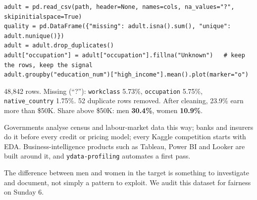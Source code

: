 \documentclass[11pt,a4paper]{article}
\begin{document}
\begin{bcode}
\begin{lstlisting}
adult = pd.read_csv(path, header=None, names=cols, na_values="?", skipinitialspace=True)
quality = pd.DataFrame({"missing": adult.isna().sum(), "unique": adult.nunique()})
adult = adult.drop_duplicates()
adult["occupation"] = adult["occupation"].fillna("Unknown")   # keep the rows, keep the signal
adult.groupby("education_num")["high_income"].mean().plot(marker="o")
\end{lstlisting}
\end{bcode}

\begin{bres}
48,842 rows. Missing (``?''): \texttt{workclass} 5.73\%, \texttt{occupation} 5.75\%, \texttt{native\_country} 1.75\%. 52 duplicate rows removed. After cleaning, 23.9\% earn more than \$50K. Share above \$50K: men \textbf{30.4\%}, women \textbf{10.9\%}.
\end{bres}

\begin{bapp}
Governments analyse census and labour-market data this way; banks and insurers do it before every credit or pricing model; every Kaggle competition starts with EDA. Business-intelligence products such as Tableau, Power BI and Looker are built around it, and \texttt{ydata-profiling} automates a first pass.
\end{bapp}
\begin{bwarn}
The difference between men and women in the target is something to investigate and document, not simply a pattern to exploit. We audit this dataset for fairness on Sunday 6.
\end{bwarn}

\end{document}
